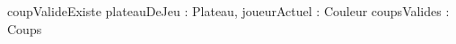 \begin{algorithme}
	\small
	\fonction
	{coupValideExiste}
	{plateauDeJeu : Plateau, joueurActuel : Couleur}
	{\booleen}
	{coupsValides : Coups}
	{
		{}
		{}
	}
\end{algorithme}
